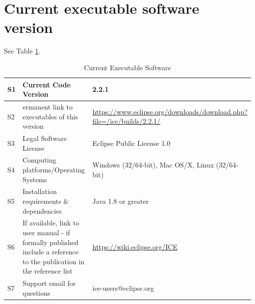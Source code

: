 \section*{Current executable software
version}\label{current-executable-software-version}

See Table \ref{execTable}.

\begin{table}[!htbp]
\begin{tabularx}{\textwidth}{|l|X|X|}
\hline
S1 & Current Code Version & 2.2.1 \tabularnewline\hline
S2 & ermanent link to executables of this version &
\url{https://www.eclipse.org/downloads/download.php?file=/ice/builds/2.2.1/}
 \tabularnewline\hline 
S3 & Legal Software License & Eclipse Public License 1.0 \tabularnewline\hline
S4 & Computing platforms/Operating Systems & Windows (32/64-bit), Mac OS/X,
Linux (32/64-bit) \tabularnewline\hline 
S5 & Installation requirements \& dependencies & Java 1.8 or
greater \tabularnewline\hline
S6 & If available, link to user manual - if formally published include a
reference to the publication in the reference list &
\url{https://wiki.eclipse.org/ICE} \tabularnewline\hline 
S7 & Support email for questions & ice-users@eclipse.org \tabularnewline\hline
\end{tabularx}
\caption{Current Executable Software}
\label{execTable}
\end{table}